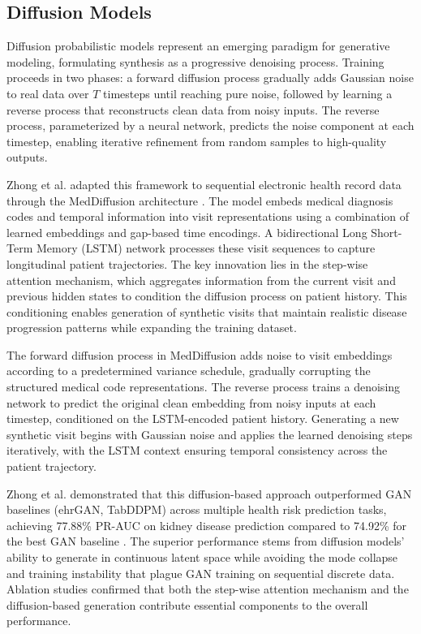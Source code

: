 \subsection{Diffusion Models}

Diffusion probabilistic models represent an emerging paradigm for generative modeling, formulating synthesis as a progressive denoising process. Training proceeds in two phases: a forward diffusion process gradually adds Gaussian noise to real data over $T$ timesteps until reaching pure noise, followed by learning a reverse process that reconstructs clean data from noisy inputs. The reverse process, parameterized by a neural network, predicts the noise component at each timestep, enabling iterative refinement from random samples to high-quality outputs.

Zhong et al. adapted this framework to sequential electronic health record data through the MedDiffusion architecture \cite{zhong2024meddiffusion}. The model embeds medical diagnosis codes and temporal information into visit representations using a combination of learned embeddings and gap-based time encodings. A bidirectional Long Short-Term Memory (LSTM) network processes these visit sequences to capture longitudinal patient trajectories. The key innovation lies in the step-wise attention mechanism, which aggregates information from the current visit and previous hidden states to condition the diffusion process on patient history. This conditioning enables generation of synthetic visits that maintain realistic disease progression patterns while expanding the training dataset.

The forward diffusion process in MedDiffusion adds noise to visit embeddings according to a predetermined variance schedule, gradually corrupting the structured medical code representations. The reverse process trains a denoising network to predict the original clean embedding from noisy inputs at each timestep, conditioned on the LSTM-encoded patient history. Generating a new synthetic visit begins with Gaussian noise and applies the learned denoising steps iteratively, with the LSTM context ensuring temporal consistency across the patient trajectory.

Zhong et al. demonstrated that this diffusion-based approach outperformed GAN baselines (ehrGAN, TabDDPM) across multiple health risk prediction tasks, achieving 77.88\% PR-AUC on kidney disease prediction compared to 74.92\% for the best GAN baseline \cite{zhong2024meddiffusion}. The superior performance stems from diffusion models' ability to generate in continuous latent space while avoiding the mode collapse and training instability that plague GAN training on sequential discrete data. Ablation studies confirmed that both the step-wise attention mechanism and the diffusion-based generation contribute essential components to the overall performance.

